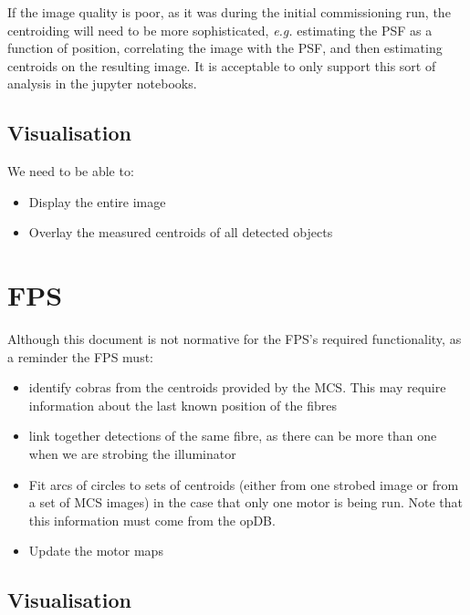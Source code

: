 \documentclass[12pt]{article}
\newcommand{\eg}{\textit{e.g.}\xspace}
\newcommand{\MCS}{\gls{MCS}\xspace}
\newcommand{\FPS}{\gls{FPS}\xspace}
\newcommand{\opDB}{\gls{opDB}\xspace}
\newcommand{\jupyter}{\gls{jupyter}\xspace}
\begin{document}
If the image quality is poor, as it was during the initial commissioning run, the centroiding will
need to be more sophisticated, \eg estimating the \gls{PSF} as a function of position, correlating
the image with the \gls{PSF}, and then estimating centroids on the resulting image.  It is
acceptable to only support this sort of analysis in the \jupyter notebooks.

\subsection{Visualisation}

We need to be able to:
\begin{itemize}
\item Display the entire image
\item Overlay the measured centroids of all detected objects
\end{itemize}

\section{FPS}

Although this document is not normative for the \FPS's required functionality, as a reminder
the \FPS must:
\begin{itemize}
\item
  identify cobras from the centroids provided by the \MCS.  This may
  require information about the last known position of the fibres
\item
  link together detections of the same fibre, as there can be more than
  one when we are strobing the illuminator
\item
  Fit arcs of circles to sets of centroids (either from one strobed image or from
  a set of \MCS images) in the case that only one motor is being run.  Note that
  this information must come from the \opDB.
\item
  Update the \glspl{motor map}
\end{itemize}

\subsection{Visualisation}
\end{document}
